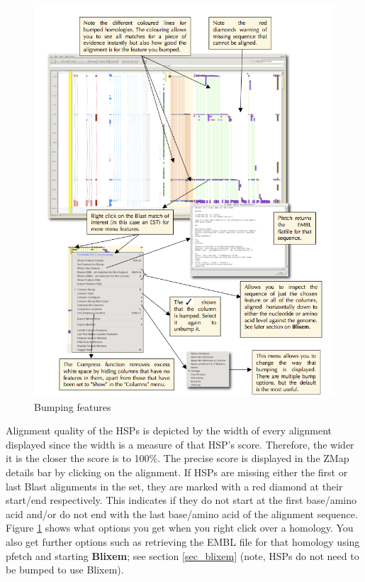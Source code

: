 \documentclass[letterpaper]{article}
\newcounter{Figure}
\begin{document}
\begin{figure}
\centering
\color[rgb]{0.30980393,0.5058824,0.7411765}
\includegraphics[width=15.231cm]{images/bumping.png}
\caption{Bumping features}
\label{img_bumping}
\end{figure}

Alignment quality of the HSPs is depicted by the width of every alignment displayed since the width is a measure of that HSP's score. Therefore, the wider it is the closer the score is to 100\%. The precise score is displayed in the ZMap details bar by clicking on the alignment. If HSPs are missing either the first or last Blast alignments in the set, they are marked with a red diamond at their start/end respectively. This indicates if they do not start at the first base/amino acid and/or do not end with the last base/amino acid of the alignment sequence. Figure \ref{img_bumping} shows what options you get when you right click over a homology. You also get further options such as retrieving the EMBL file for that homology using pfetch and starting \textbf{Blixem}; see section \ref{sec_blixem} (note, HSPs do not need to be bumped to use Blixem).
\end{document}
